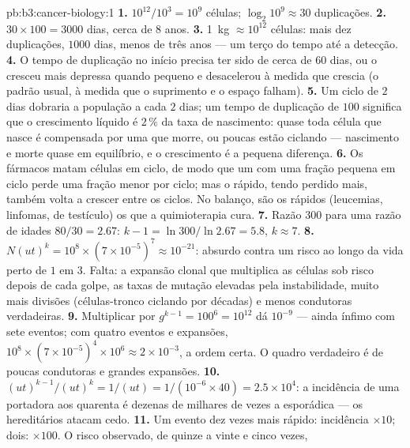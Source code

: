 \begin{solution}{pb:b3:cancer-biology:1}
\textbf{1.} $10^{12}/10^{3} = 10^{9}$ células; $\log_{2}10^{9} \approx 30$
duplicações.
\textbf{2.} $30\times 100 = 3000$ dias, cerca de $8$ anos.
\textbf{3.} \qty{1}{kg} $\approx 10^{12}$ células: mais dez
duplicações, $1000$ dias, menos de três anos --- um terço do tempo até
a detecção.
\textbf{4.} O tempo de duplicação no início precisa ter sido de cerca de
$60$ dias, ou o  cresceu mais depressa quando pequeno e desacelerou
à medida que crescia (o padrão usual, à medida que o suprimento e o
espaço falham).
\textbf{5.} Um ciclo de $2$ dias dobraria a população a cada $2$ dias;
um tempo de duplicação de $100$ significa que o crescimento líquido é
$2\,\%$ da taxa de nascimento: quase toda célula que nasce é compensada
por uma que morre, ou poucas estão ciclando --- nascimento e morte
quase em equilíbrio, e o crescimento é a pequena diferença.
\textbf{6.} Os fármacos matam células em ciclo, de modo que um  com
uma fração pequena em ciclo perde uma fração menor por ciclo; mas o
 rápido, tendo perdido mais, também volta a crescer entre os
ciclos. No balanço, são os  rápidos (leucemias, linfomas, 
de testículo) os que a quimioterapia cura.
\textbf{7.} Razão $300$ para uma razão de idades $80/30 = 2.67$:
$k - 1 =
\ln 300/\ln 2.67 = 5.8$, $k \approx 7$.
\textbf{8.} $N(ut)^{k} = 10^{8}\times (7\times 10^{-5})^{7} \approx
10^{-21}$: absurdo contra um risco ao longo da vida perto de $1$ em
$3$. Falta: a expansão clonal que multiplica as células sob risco
depois de cada golpe, as taxas de mutação elevadas pela instabilidade,
muito mais divisões (células-tronco ciclando por décadas) e menos
condutoras verdadeiras.
\textbf{9.} Multiplicar por $g^{k-1} = 100^{6} = 10^{12}$ dá $10^{-9}$
--- ainda ínfimo com sete eventos; com quatro eventos e expansões,
$10^{8}\times (7\times 10^{-5})^{4}\times 10^{6} \approx 2\times
10^{-3}$, a ordem certa. O quadro verdadeiro é de poucas condutoras e
grandes expansões.
\textbf{10.} $(ut)^{k-1}/(ut)^{k} = 1/(ut) = 1/(10^{-6}\times 40) =
2.5\times 10^{4}$: a incidência de uma portadora aos quarenta é dezenas
de milhares de vezes a esporádica --- os  hereditários atacam
cedo.
\textbf{11.} Um evento dez vezes mais rápido: incidência $\times 10$;
dois: $\times 100$. O risco observado, de quinze a vinte e cinco vezes,

\end{solution}

